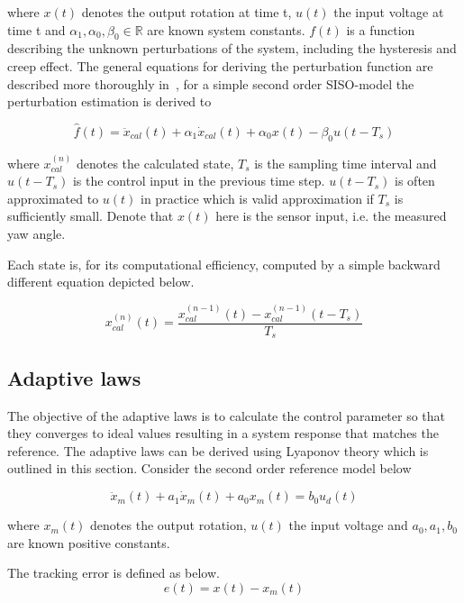 where $x(t)$ denotes the output rotation at time t, $u(t)$ the input voltage at time t and $\alpha_1, \alpha_0, \beta_0 \in \mathbb{R}$ are known system constants. $f(t)$ is a function describing the unknown perturbations of the system, including the hysteresis and creep effect. The general equations for deriving the perturbation function are described more thoroughly in~\citep{Elmali:1996}, for a simple second order SISO-model the perturbation estimation is derived to

\begin{equation}
  \label{eq:perturbation}
  \hat{f}(t) = \ddot{x}_{cal}(t) + \alpha_1\dot{x}_{cal}(t) +  \alpha_0x(t) - \beta_0u(t-T_s)
\end{equation}

where $x_{cal}^{(n)}$ denotes the calculated state, $T_s$ is the sampling time interval and $u(t-T_s)$ is the control input in the previous time step. $u(t-T_s)$ is often approximated to $u(t)$ in practice which is valid approximation if $T_s$ is sufficiently small. Denote that $x(t)$ here is the sensor input, i.e. the measured yaw angle.

Each state is, for its computational efficiency, computed by a simple backward different equation depicted below.

\begin{equation}
  \label{eq:backward}
  x_{cal}^{(n)}(t) = \frac{x_{cal}^{(n-1)}(t) - x_{cal}^{(n-1)}(t-T_s)}{T_s}
\end{equation}

\subsection{Adaptive laws}
The objective of the adaptive laws is to calculate the control parameter so that they converges to ideal values resulting in a system response that matches the reference. The adaptive laws can be derived using Lyaponov theory which is outlined in this section. Consider the second order reference model below

\begin{equation}
  \label{eq:refmodel}
  \ddot{x}_m(t) + a_1\dot{x}_m(t) +  a_0x_m(t) = b_0u_d(t)
\end{equation}

where $x_m(t)$ denotes the output rotation, $u(t)$ the input voltage and $a_0, a_1, b_0$ are known positive constants.

The tracking error is defined as below.
\begin{equation}
  \label{eq:stateerror}
  e(t) = x(t) - x_m(t)
\end{equation}

